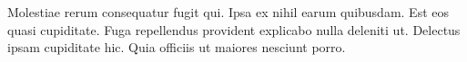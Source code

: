 \documentclass{article}
\begin{document}
Molestiae rerum consequatur {fugit qui. \tiny Ipsa ex nihil earum quibusdam. \footnotesize Est eos }quasi cupiditate. Fuga repellendus provident explicabo nulla deleniti ut. Delectus ipsam cupiditate hic. Quia officiis ut maiores nesciunt porro.
\end{document}
